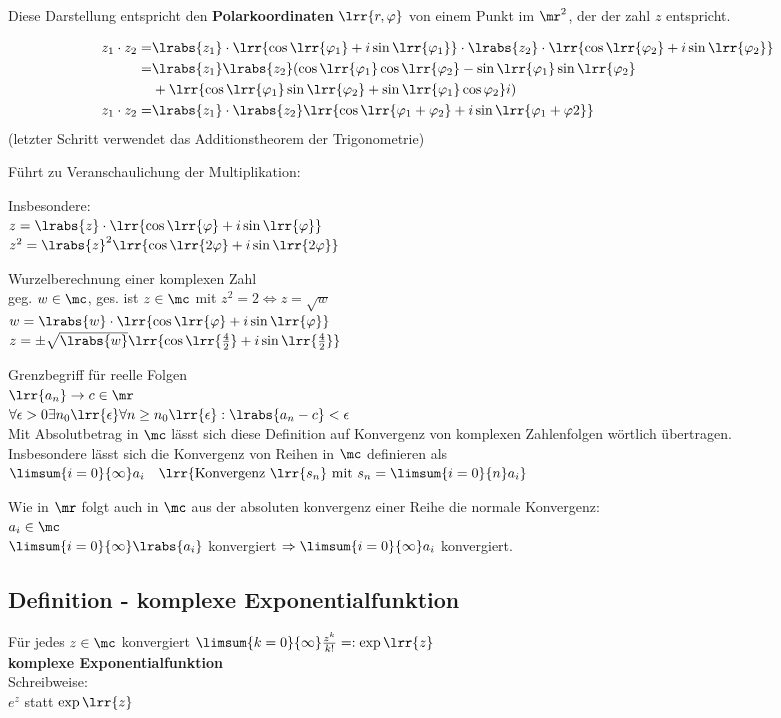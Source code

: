 			Diese Darstellung entspricht den \textbf{Polarkoordinaten} $\lrr{r,\varphi}$ von einem Punkt im $\mr^2$, der der zahl $z$ entspricht.
		\item \begin{align*}
				z_1\cdot z_2=&\lrabs{z_1}\cdot\lrr{\cos\lrr{\varphi_1}+i\sin\lrr{\varphi_1}}\cdot\lrabs{z_2}\cdot\lrr{\cos\lrr{\varphi_2}+i\sin\lrr{\varphi_2}}\\
				=&\lrabs{z_1}\lrabs{z_2}(\cos\lrr{\varphi_1}\cos\lrr{\varphi_2}-\sin\lrr{\varphi_1}\sin\lrr{\varphi_2}\\
				&+\lrr{\cos\lrr{\varphi_1}\sin\lrr{\varphi_2}+\sin\lrr{\varphi_1}\cos\varphi_2}i)\\
				z_1\cdot z_2=&\lrabs{z_1}\cdot\lrabs{z_2}\lrr{\cos\lrr{\varphi_1+\varphi_2}+i\sin\lrr{\varphi_1+\varphi2}}
			\end{align*}
			(letzter Schritt verwendet das Additionstheorem der Trigonometrie)
			
			Führt zu Veranschaulichung der Multiplikation:
			
			
			Insbesondere:\\
			$z=\lrabs{z}\cdot\lrr{\cos\lrr{\varphi}+i\sin\lrr{\varphi}}$\\
			$z^2=\lrabs{z}^2\lrr{\cos\lrr{2\varphi}+i\sin\lrr{2\varphi}}$
		\item Wurzelberechnung einer komplexen Zahl\\
			geg. $w\in\mc$, ges. ist $z\in\mc$ mit $z^2=2\Leftrightarrow z=\sqrt{w}$\\
			$w=\lrabs{w}\cdot\lrr{\cos\lrr{\varphi}+i\sin\lrr{\varphi}}$\\
			$z=\pm\sqrt{\lrabs{w}}\lrr{\cos\lrr{\frac{4}{2}}+i\sin\lrr{\frac{4}{2}}}$
			
			Grenzbegriff für reelle Folgen\\
			$\lrr{a_n}\rightarrow c\in\mr$\\
			$\forall\epsilon >0\exists n_0\lrr{\epsilon}\forall n\geq n_0\lrr{\epsilon}:\lrabs{a_n-c}<\epsilon$\\
			Mit Absolutbetrag in $\mc$ lässt sich diese Definition auf Konvergenz von komplexen Zahlenfolgen wörtlich übertragen.\\
			Insbesondere lässt sich die Konvergenz von Reihen in $\mc$ definieren als\\
			$\limsum{i=0}{\infty}a_i\quad\lrr{\mbox{Konvergenz } \lrr{s_n} \mbox{ mit } s_n=\limsum{i=0}{n}a_i}$
			
			Wie in $\mr$ folgt auch in $\mc$ aus der absoluten konvergenz einer Reihe die normale Konvergenz:\\
			$a_i\in\mc$\\
			$\limsum{i=0}{\infty}\lrabs{a_i}$ konvergiert $\Rightarrow \limsum{i=0}{\infty}a_i$ konvergiert.
	\subExEnd

\subsection{Definition - komplexe Exponentialfunktion}
	Für jedes $z\in\mc$ konvergiert $\limsum{k=0}{\infty}\frac{z^k}{k!}=:\exp\lrr{z}$\\
	\textbf{komplexe Exponentialfunktion}\\
	Schreibweise:\\
	$e^z$ statt $\exp\lrr{z}$
	